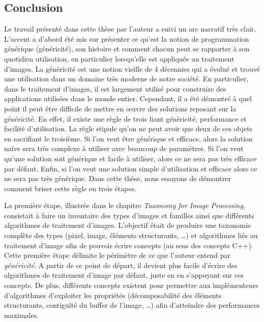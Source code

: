 \subsection*{Conclusion}


Le travail présenté dans cette thèse par l'auteur a suivi un arc narratif très clair. L'accent a d'abord été mis sur
présenter ce qu'est la notion de programmation générique (généricité), son histoire et comment chacun peut se rapporter
à son quotidien utilisation, en particulier lorsqu'elle est appliquée au traitement d'images. La généricité est une
notion vieille de 4 décennies qui a évolué et trouvé une utilisation dans un domaine très moderne de notre société. En
particulier, dans le traitement d'images, il est largement utilisé pour construire des applications utilisées dans le
monde entier. Cependant, il a été démontré à quel point il peut être difficile de mettre en œuvre des solutions reposant
sur la généricité. En effet, il existe une règle de trois liant généricité, performance et facilité d'utilisation. La
règle stipule qu'on ne peut avoir que deux de ces objets en sacrifiant le troisième. Si l'on veut être générique et
efficace, alors la solution naïve sera très complexe à utiliser avec beaucoup de paramètres. Si l'on veut qu'une
solution soit générique et facile à utiliser, alors ce ne sera pas très efficace par défaut. Enfin, si l'on veut une
solution simple d'utilisation et efficace alors ce ne sera pas très générique. Dans cette thèse, nous essayons de
démontrer comment briser cette règle en trois étapes.

La première étape, illustrée dans le chapitre \emph{Taxonomy for Image Processing}, consistait à faire un inventaire des
types d'images et familles ainsi que différents algorithmes de traitement d'images. L'objectif était de produire une
taxonomie complète des types (pixel, image, éléments structurants, \ldots) et algorithmes liés au traitement d'image
afin de pouvoir écrire concepts (au sens des concepts C++). Cette première étape délimite le périmètre de ce que
l'auteur entend par \emph{généricité}. A partir de ce point de départ, il devient plus facile d'écrire des algorithmes
de traitement d'image par défaut, juste en en s'appuyant sur ces concepts. De plus, différents concepts existent pour
permettre aux implémenteurs d'algorithmes d'exploiter les propriétés (décomposabilité des éléments structurants,
contiguïté du buffer de l'image, \ldots) afin d'atteindre des performances maximales.

